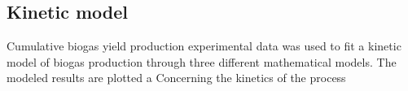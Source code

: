 \subsection{Kinetic model}
Cumulative biogas yield production experimental data was used to fit a kinetic model of biogas production through three different mathematical models. The modeled results are plotted a
Concerning the kinetics of the process